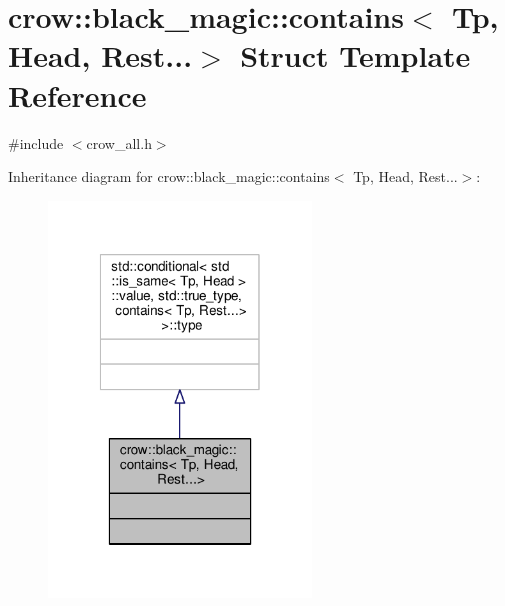 \hypertarget{structcrow_1_1black__magic_1_1contains_3_01_tp_00_01_head_00_01_rest_8_8_8_4}{\section{crow\-:\-:black\-\_\-magic\-:\-:contains$<$ Tp, Head, Rest...$>$ Struct Template Reference}
\label{structcrow_1_1black__magic_1_1contains_3_01_tp_00_01_head_00_01_rest_8_8_8_4}
}


{\ttfamily \#include $<$crow\-\_\-all.\-h$>$}



Inheritance diagram for crow\-:\-:black\-\_\-magic\-:\-:contains$<$ Tp, Head, Rest...$>$\-:
\nopagebreak
\begin{figure}[H]
\begin{center}
\leavevmode
\includegraphics[width=198pt]{structcrow_1_1black__magic_1_1contains_3_01_tp_00_01_head_00_01_rest_8_8_8_4__inherit__graph}
\end{center}
\end{figure}


